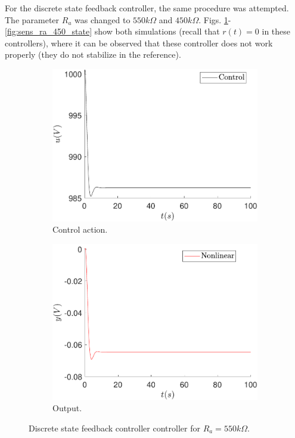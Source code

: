 	For the discrete state feedback controller, the same procedure was attempted. The parameter $R_a$ was changed to $550k\Omega$ and $450k\Omega$. Figs. \ref{fig:sens_ra_550_state}-\ref{fig:sens_ra_450_state} show both simulations (recall that $r(t)=0$ in these controllers), where it can be observed that these controller does not work properly (they do not stabilize in the reference).
	
	\begin{figure}
        \centering
        \begin{subfigure}[b]{0.475\textwidth}
            \centering
            \includegraphics[scale=0.425]{files/sens_analysis/Ref0/control_analysis_sfc_a_550.pdf}
            \caption{Control action.}
        \end{subfigure}
        \vskip0.1cm
        \begin{subfigure}[b]{0.475\textwidth}   
            \centering 
            \includegraphics[scale=0.425]{files/sens_analysis/Ref0/analysis_sfc_a_550.pdf}            \caption{Output.}
        \end{subfigure}
        \caption{Discrete state feedback controller controller for $R_a=550k\Omega$.}
        \label{fig:sens_ra_550_state}
	\end{figure}
	
